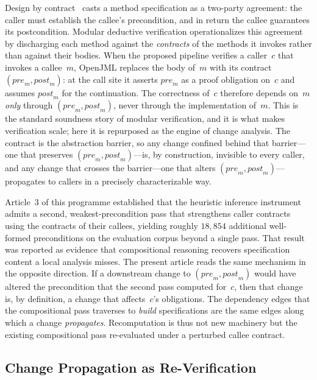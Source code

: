 Design by contract~\cite{meyer1992dbc} casts a method specification as a
two-party agreement: the caller must establish the callee's precondition, and in
return the callee guarantees its postcondition. Modular deductive verification
operationalizes this agreement by discharging each method against the
\emph{contracts} of the methods it invokes rather than against their bodies. When
the proposed pipeline verifies a caller~$c$ that invokes a callee~$m$, OpenJML
replaces the body of~$m$ with its contract $(\mathit{pre}_m,
\mathit{post}_m)$: at the call site it asserts $\mathit{pre}_m$ as a proof
obligation on~$c$ and assumes $\mathit{post}_m$ for the continuation. The
correctness of~$c$ therefore depends on~$m$ \emph{only} through
$(\mathit{pre}_m, \mathit{post}_m)$, never through the implementation of~$m$.
This is the standard soundness story of modular verification, and it is what
makes verification scale; here it is repurposed as the engine of change
analysis. The contract is the abstraction barrier, so any change confined behind
that barrier---one that preserves $(\mathit{pre}_m, \mathit{post}_m)$---is, by
construction, invisible to every caller, and any change that crosses the
barrier---one that alters $(\mathit{pre}_m, \mathit{post}_m)$---propagates to
callers in a precisely characterizable way.

Article~3 of this programme established that the heuristic inference instrument
admits a second, weakest-precondition pass that strengthens caller contracts
using the contracts of their callees, yielding roughly $18{,}854$ additional
well-formed preconditions on the evaluation corpus beyond a single pass. That
result was reported as evidence that compositional reasoning recovers
specification content a local analysis misses. The present article reads the same
mechanism in the opposite direction. If a downstream change to
$(\mathit{pre}_m, \mathit{post}_m)$ would have altered the precondition that the
second pass computed for~$c$, then that change is, by definition, a change that
affects~$c$'s obligations. The dependency edges that the compositional pass
traverses to \emph{build} specifications are the same edges along which a change
\emph{propagates}. Recomputation is thus not new machinery but the existing
compositional pass re-evaluated under a perturbed callee contract.

\subsection{Change Propagation as Re-Verification}\label{subsec:reverify}

